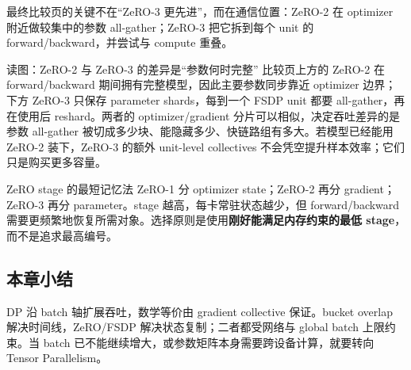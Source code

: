 最终比较页的关键不在“ZeRO-3 更先进”，而在通信位置：ZeRO-2 在 optimizer 附近做较集中的参数 all-gather；ZeRO-3 把它拆到每个 unit 的 forward/backward，并尝试与 compute 重叠。



\begin{knowledgebox}{读图：ZeRO-2 与 ZeRO-3 的差异是“参数何时完整”}
比较页上方的 ZeRO-2 在 forward/backward 期间拥有完整模型，因此主要参数同步靠近 optimizer 边界；下方 ZeRO-3 只保存 parameter shards，每到一个 FSDP unit 都要 all-gather，再在使用后 reshard。两者的 optimizer/gradient 分片可以相似，决定吞吐差异的是参数 all-gather 被切成多少块、能隐藏多少、快链路组有多大。若模型已经能用 ZeRO-2 装下，ZeRO-3 的额外 unit-level collectives 不会凭空提升样本效率；它们只是购买更多容量。
\end{knowledgebox}


\begin{importantbox}{ZeRO stage 的最短记忆法}
ZeRO-1 分 optimizer state；ZeRO-2 再分 gradient；ZeRO-3 再分 parameter。stage 越高，每卡常驻状态越少，但 forward/backward 需要更频繁地恢复所需对象。选择原则是使用\textbf{刚好能满足内存约束的最低 stage}，而不是追求最高编号。
\end{importantbox}

\subsection{本章小结}

DP 沿 batch 轴扩展吞吐，数学等价由 gradient collective 保证。bucket overlap 解决时间线，ZeRO/FSDP 解决状态复制；二者都受网络与 global batch 上限约束。当 batch 已不能继续增大，或参数矩阵本身需要跨设备计算，就要转向 Tensor Parallelism。


